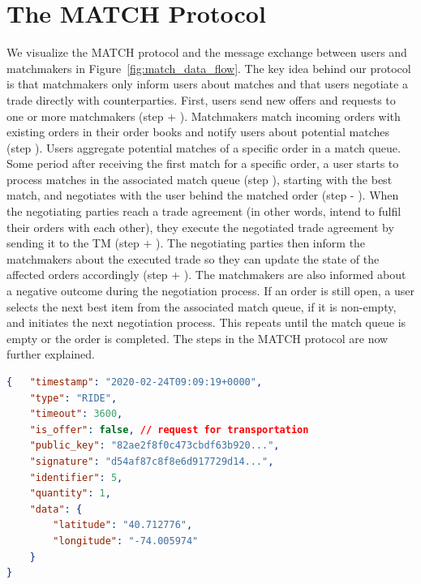 \section{The MATCH Protocol}
\label{sec:protocol}
We visualize the MATCH protocol and the message exchange between users and matchmakers in Figure~\ref{fig:match_data_flow}.
The key idea behind our protocol is that matchmakers only inform users about matches and that users negotiate a trade directly with counterparties.
First, users send new offers and requests to one or more matchmakers (step  + ).
Matchmakers match incoming orders with existing orders in their order books and notify users about potential matches (step ).
Users aggregate potential matches of a specific order in a match queue.
Some period after receiving the first match for a specific order, a user starts to process matches in the associated match queue (step ), starting with the best match, and negotiates with the user behind the matched order (step  - ).
When the negotiating parties reach a trade agreement (in other words, intend to fulfil their orders with each other), they execute the negotiated trade agreement by sending it to the TM (step  + ).
The negotiating parties then inform the matchmakers about the executed trade so they can update the state of the affected orders accordingly (step  + ).
The matchmakers are also informed about a negative outcome during the negotiation process.
If an order is still open, a user selects the next best item from the associated match queue, if it is non-empty, and initiates the next negotiation process.
This repeats until the match queue is empty or the order is completed.
The steps in the MATCH protocol are now further explained.

\begin{lstlisting}[language=json,firstnumber=1,float=b,caption=An order in a ride-hailing market (in JSON format).,label=lst:order_example]
{	"timestamp": "2020-02-24T09:09:19+0000",
	"type": "RIDE",
	"timeout": 3600,
	"is_offer": false, // request for transportation
	"public_key": "82ae2f8f0c473cbdf63b920...",
	"signature": "d54af87c8f8e6d917729d14...",
	"identifier": 5,
	"quantity": 1,
	"data": {
		"latitude": "40.712776",
		"longitude": "-74.005974"
	}
}
\end{lstlisting}

